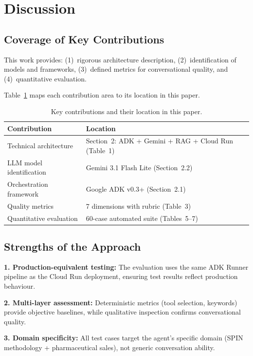 \documentclass[10pt,twocolumn,a4paper]{article}
\begin{document}
\section{Discussion}
\label{sec:discussion}

\subsection{Coverage of Key Contributions}

This work provides: (1)~rigorous architecture description, (2)~identification of models and frameworks, (3)~defined metrics for conversational quality, and (4)~quantitative evaluation.

Table~\ref{tab:contributions} maps each contribution area to its location in this paper.

\begin{table}[H]
\caption{Key contributions and their location in this paper.}
\label{tab:contributions}
\setlength{\tabcolsep}{16pt}
\renewcommand{\arraystretch}{1.4}
\begin{tabular}{p{2.5cm} p{3.5cm}}
\toprule
\textbf{Contribution} & \textbf{Location} \\
\midrule
Technical architecture & Section~2: ADK + Gemini + RAG + Cloud Run (Table~1) \\
LLM model identification & Gemini 3.1 Flash Lite (Section~2.2) \\
Orchestration framework & Google ADK v0.3+ (Section~2.1) \\
Quality metrics & 7 dimensions with rubric (Table~3) \\
Quantitative evaluation & 60-case automated suite (Tables~5--7) \\
\bottomrule
\end{tabular}
\end{table}

\subsection{Strengths of the Approach}

\textbf{1. Production-equivalent testing:} The evaluation uses the same ADK Runner pipeline as the Cloud Run deployment, ensuring test results reflect production behaviour.

\textbf{2. Multi-layer assessment:} Deterministic metrics (tool selection, keywords) provide objective baselines, while qualitative inspection confirms conversational quality.

\textbf{3. Domain specificity:} All test cases target the agent's specific domain (SPIN methodology + pharmaceutical sales), not generic conversation ability.
\end{document}

